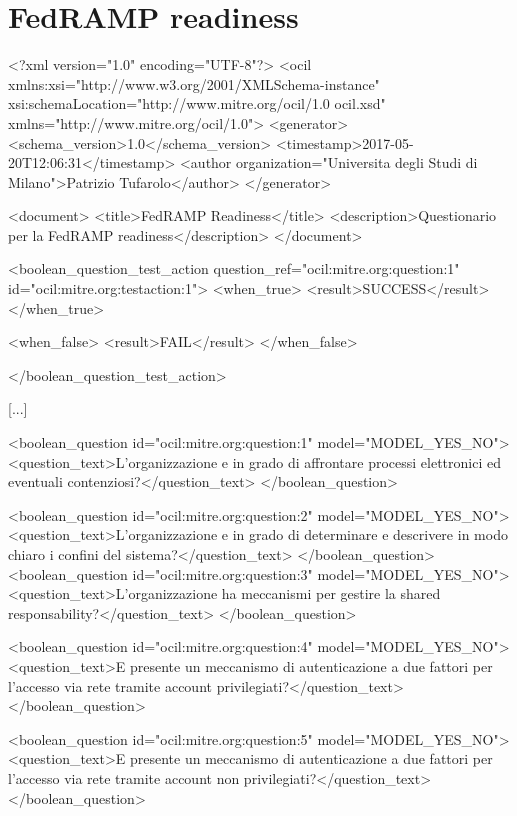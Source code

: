 \chapter{FedRAMP readiness}
\begin{xml}
<?xml version="1.0" encoding="UTF-8"?>
<ocil xmlns:xsi="http://www.w3.org/2001/XMLSchema-instance"
  xsi:schemaLocation="http://www.mitre.org/ocil/1.0 ocil.xsd" xmlns="http://www.mitre.org/ocil/1.0">
  <generator>
    <schema_version>1.0</schema_version>
    <timestamp>2017-05-20T12:06:31</timestamp>
    <author organization="Universita degli Studi di Milano">Patrizio Tufarolo</author>
  </generator>

  <document>
    <title>FedRAMP Readiness</title>
    <description>Questionario per la FedRAMP readiness</description>
  </document>

  <boolean_question_test_action question_ref="ocil:mitre.org:question:1" id="ocil:mitre.org:testaction:1">
    <when_true>
      <result>SUCCESS</result>
    </when_true>

    <when_false>
      <result>FAIL</result>
    </when_false>

  </boolean_question_test_action>

  

  [...]



  <boolean_question id="ocil:mitre.org:question:1" model="MODEL_YES_NO">
    <question_text>L'organizzazione e in grado di affrontare processi elettronici ed eventuali contenziosi?</question_text>
  </boolean_question>

  <boolean_question id="ocil:mitre.org:question:2" model="MODEL_YES_NO">
    <question_text>L'organizzazione e in grado di determinare e descrivere in modo chiaro i confini del sistema?</question_text>
  </boolean_question>
  <boolean_question id="ocil:mitre.org:question:3" model="MODEL_YES_NO">
    <question_text>L'organizzazione ha meccanismi per gestire la shared responsability?</question_text>
  </boolean_question>

  <boolean_question id="ocil:mitre.org:question:4" model="MODEL_YES_NO">
    <question_text>E presente un meccanismo di autenticazione a due fattori per l'accesso via rete tramite account privilegiati?</question_text>
  </boolean_question>

  <boolean_question id="ocil:mitre.org:question:5" model="MODEL_YES_NO">
    <question_text>E presente un meccanismo di autenticazione a due fattori per l'accesso via rete tramite account non privilegiati?</question_text>
  </boolean_question>


\end{xml}
